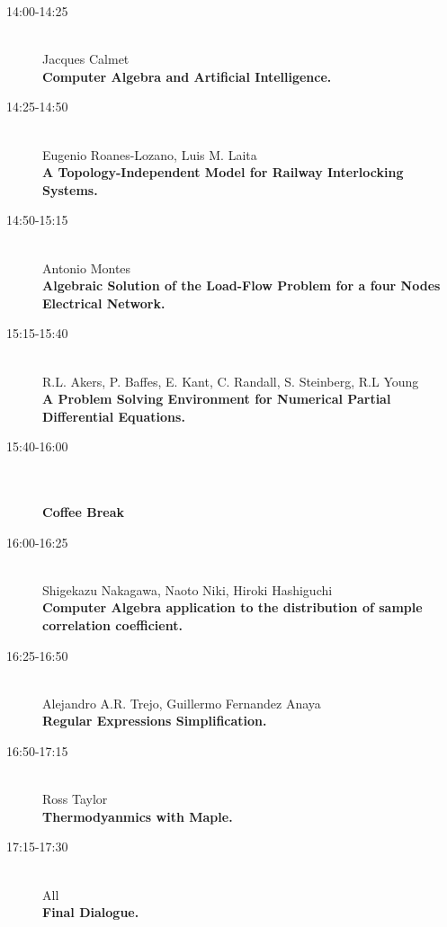 \begin{description}
\item[14:00-14:25] \ \\
  Jacques Calmet\\
  {\bf Computer Algebra and Artificial Intelligence.} 
\item[14:25-14:50 ] \ \\
  Eugenio Roanes-Lozano, Luis M. Laita\\
  {\bf A Topology-Independent Model for Railway Interlocking Systems.} 
\item[14:50-15:15] \ \\
  Antonio Montes\\
  {\bf Algebraic Solution of the Load-Flow Problem for a four Nodes Electrical Network.} 
\item[15:15-15:40] \ \\
  R.L. Akers, P. Baffes, E. Kant, C. Randall, S. Steinberg, R.L Young
\\
  {\bf A Problem Solving Environment for Numerical Partial
    Differential Equations.} 
\item[15:40-16:00] \ \\
  \\
  {\bf Coffee Break} 
\item[16:00-16:25] \ \\
  Shigekazu Nakagawa, Naoto Niki, Hiroki Hashiguchi
\\
  {\bf Computer Algebra application to the distribution of sample
    correlation  coefficient.} 
\item[16:25-16:50 ] \ \\
  Alejandro A.R. Trejo, Guillermo Fernandez Anaya
\\
  {\bf Regular Expressions Simplification.
} 
\item[16:50-17:15 ] \ \\
  Ross Taylor\\
  {\bf Thermodyanmics with Maple.} 
\item[17:15-17:30 ] \ \\
  All\\
  {\bf Final Dialogue.} 
\end{description}


